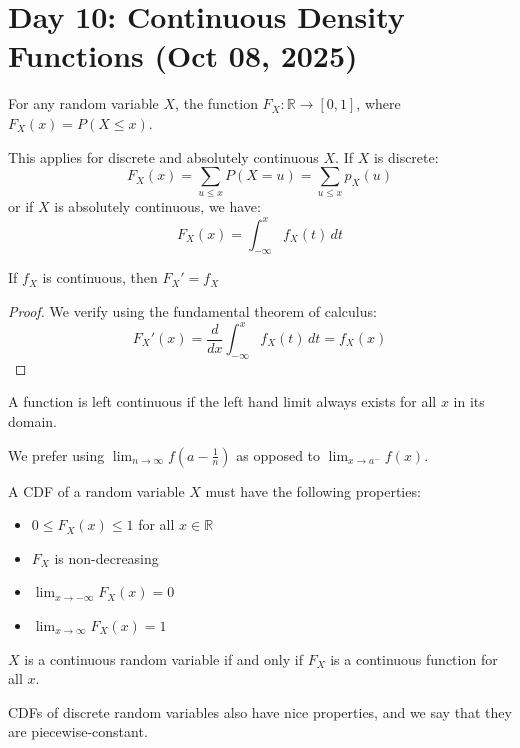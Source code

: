 \section{Day 10: Continuous Density Functions (Oct 08, 2025)}

\begin{definition}[CDF]
    For any random variable $X$, the function $F_X: \mathbb{R} \to [0, 1]$, where $F_X(x) = P(X \leq x)$. 
\end{definition}

\noindent This applies for discrete and absolutely continuous $X$. If $X$ is discrete:
\[
F_X(x) = \sum_{u \leq x} P(X = u) = \sum_{u \leq x} p_X(u)
\]
or if $X$ is absolutely continuous, we have:
\[
F_X(x) = \int_{-\infty}^x f_X(t) \, dt
\]
\begin{simplethm}
    If $f_X$ is continuous, then $F_X' = f_X$
\end{simplethm}

\begin{proof}
    We verify using the fundamental theorem of calculus:
    \[
    F_X'(x) = \frac{d}{dx} \int_{-\infty}^x f_X(t) \, dt = f_X(x)
    \]
\end{proof}

\begin{definition}
    A function is left continuous if the left hand limit always exists for all $x$ in its domain. 
\end{definition}

We prefer using $\displaystyle \lim_{ n \to \infty } f\left(a - \frac{1}{n}\right)$ as opposed to $\displaystyle \lim_{ x \to a^- } f(x)$. 

\begin{theorem}
    A CDF of a random variable $X$ must have the following properties:
\begin{itemize}
    \item $0 \leq F_X(x) \leq 1$ for all $x \in \mathbb{R}$
    \item $F_X$ is non-decreasing
    \item $\displaystyle \lim_{ x \to -\infty } F_X(x) = 0$
    \item $\displaystyle \lim_{ x \to \infty } F_X(x) = 1$
\end{itemize}
\end{theorem}

\begin{simplethm}
$X$ is a continuous random variable if and only if $F_X$ is a continuous function for all $x$. 
\end{simplethm}

\noindent CDFs of discrete random variables also have nice properties, and we say that they are piecewise-constant.

